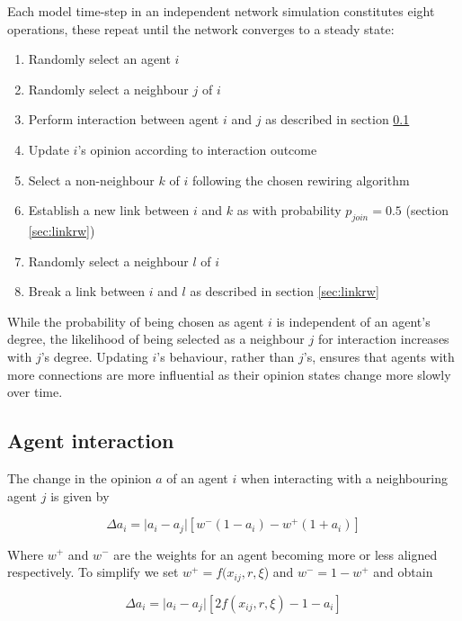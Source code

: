 \documentclass[unnumsec,webpdf,contemporary,large]{oup-authoring-template}%
\theoremstyle{thmstyleone}%
\theoremstyle{thmstyletwo}%
\theoremstyle{thmstylethree}%
\begin{document}
Each model time-step in an independent network simulation constitutes eight operations, these repeat until the network converges to a steady state:

\begin{enumerate}
    \item Randomly select an agent \(i\)
    \item Randomly select a neighbour \(j\) of \(i\)
    \item Perform interaction between agent \(i\) and \(j\) as described in section \ref{sec:agentinteraction}
    \item Update \(i\)'s opinion according to interaction outcome
    \item Select a non-neighbour \(k\) of \(i\) following the chosen rewiring algorithm
    \item  Establish a new link between \(i\) and \(k\) as with probability $p_{join}=0.5$ (section \ref{sec:linkrw})
    \item Randomly select a neighbour \(l\) of \(i\)
    \item  Break a link between \(i\) and \(l\) as described in section \ref{sec:linkrw}
\end{enumerate}

While the probability of being chosen as agent \(i\) is independent of an agent's degree, the likelihood of being selected as a neighbour \(j\) for interaction increases with $j$'s degree. Updating $i$'s behaviour, rather than $j$'s, ensures that agents with more connections are more influential as their opinion states change more slowly over time.

\subsection{Agent interaction}\label{sec:agentinteraction}

The change in the opinion \(a\) of an agent \(i\) when interacting with a neighbouring agent \(j\) is given by

\begin{equation}
\Delta a_i = \lvert a_i - a_j\rvert [w^- (1-a_i)-w^+ (1+a_i)]
\end{equation}

Where \(w^+\) and \(w^-\) are the weights for an agent becoming more or less aligned respectively. To simplify we set \(w^+ = f(x_{ij},r,\xi\)) and \(w^- = 1- w^+\) and obtain

\begin{equation}\label{eq:interaction}
\Delta a_i = \lvert a_i - a_j \rvert [2f(x_{ij},r,\xi) - 1 - a_i]
\end{equation}
\end{document}
